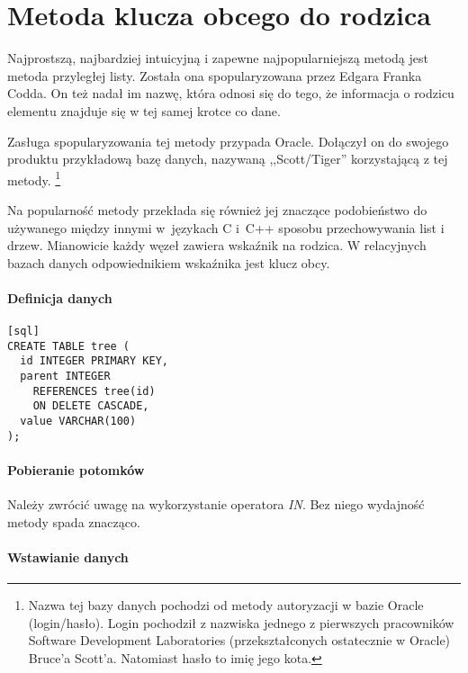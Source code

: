 \section{Metoda klucza obcego do rodzica}







Najprostszą, najbardziej intuicyjną i zapewne najpopularniejszą metodą jest metoda przyległej listy.
Została ona spopularyzowana przez Edgara Franka Codda. 
On też nadał im nazwę, która odnosi się do tego, że informacja o rodzicu elementu znajduje się w tej samej krotce co dane.

Zasługa spopularyzowania tej metody przypada Oracle. 
Dołączył on do swojego produktu przykładową bazę danych, nazywaną ,,Scott/Tiger'' 
korzystającą z tej metody.
\footnote{
    Nazwa tej bazy danych pochodzi od metody autoryzacji w bazie Oracle (login/hasło).
    Login pochodził z nazwiska jednego z pierwszych pracowników 
    Software Development Laboratories (przekształconych ostatecznie w Oracle) Bruce'a Scott'a. 
    Natomiast hasło to imię jego kota.
}

Na popularność metody przekłada się również jej znaczące podobieństwo do 
używanego między innymi w~językach C i~C++ sposobu przechowywania list i drzew.
Mianowicie każdy węzeł zawiera wskaźnik na rodzica. 
W relacyjnych bazach danych odpowiednikiem wskaźnika jest klucz obcy. 

\paragraph{Definicja danych}

\begin{verbatim}[sql]
CREATE TABLE tree (  
  id INTEGER PRIMARY KEY,  
  parent INTEGER  
    REFERENCES tree(id)  
    ON DELETE CASCADE,  
  value VARCHAR(100)  
);
\end{verbatim}

\paragraph{Pobieranie potomków}

Należy zwrócić uwagę na wykorzystanie operatora \emph{IN}. Bez niego wydajność metody spada znacząco. 

\paragraph{Wstawianie danych}

